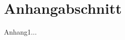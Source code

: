 \documentclass[../../../Arbeit]{subfiles}
\begin{document}
\section{Anhangabschnitt}
Anhang1...
\end{document}
